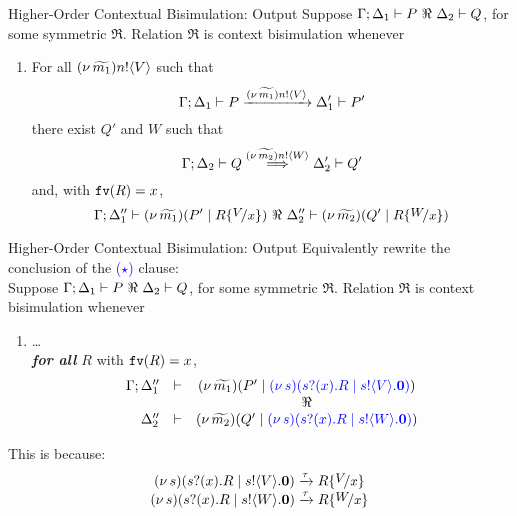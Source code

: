 \documentclass{beamer}
\newcommand{\prcolor}[1]{{\color{blue} #1}}
\begin{document}
	\begin{frame}{Higher-Order Contextual Bisimulation: Output}
		Suppose $\Gamma; \Delta_1 \proves P\ \Re\ \Delta_2 \proves Q$, for some symmetric $\Re$. Relation $\Re$ is
		context bisimulation whenever
		\begin{enumerate}[$(\star)$]
			\item	For all $(\nu\, \widetilde{m_1}) n ! \langle V \rangle$ such that
				\[
					\Gamma; \Delta_1 \vdash P \xrightarrow{(\nu\, \widetilde{m_1}) n ! \langle V \rangle} \Delta_1' \vdash P'
				\]
				there exist $Q'$ and $W$ such that 
				\[
					\Gamma; \Delta_2 \vdash Q \stackrel{(\nu\, \widetilde{m_2}) n ! \langle W \rangle}{\Longrightarrow} \Delta_2' \vdash Q'
				\]
				and,   with $\mathtt{fv}(R)=x$, 
				\[
					\Gamma; \Delta_1'' \proves \newsp{\widetilde{m_1}}{P' \Par R\subst{V}{x}}\ \Re\ \Delta_2'' \proves \newsp{\widetilde{m_2}}{Q' \Par R\subst{W}{x}}
				\]
		\end{enumerate}
	\end{frame}

	\begin{frame}{Higher-Order Contextual Bisimulation: Output}
		Equivalently rewrite the conclusion of the \textcolor{blue}{($\star$)} clause:
		\\[2mm]

		Suppose $\Gamma; \Delta_1 \proves P\ \Re\ \Delta_2 \proves Q$, for some symmetric $\Re$. Relation $\Re$ is
		context bisimulation whenever
		\begin{enumerate}[$(\star)$]
			\item	\dots\\
				\emph{\textbf{for all} $R$}  with $\mathtt{fv}(R)=x$, 
				\[
					\begin{array}{rcc}
						\Gamma; \Delta_1'' &\proves& \newsp{\widetilde{m_1}}{P' \Par \prcolor{\newsp{s}{\binp{s}{x} R \Par  \bout{s}{V} \inact}}}
						\\
						&&\Re
						\\
						\Delta_2'' &\proves&  \newsp{\widetilde{m_2}}{Q' \Par \prcolor{\newsp{s}{\binp{s}{x} R \Par \bout{s}{W} \inact}}}
					\end{array}
				\]
		\end{enumerate}
		This is because:
		\[
			\begin{array}{c}
				\newsp{s}{\binp{s}{x} R \Par \bout{s}{V} \inact}
				\by{\tau}
				R \subst{V}{x}
				\\
				\newsp{s}{\binp{s}{x} R \Par \bout{s}{W} \inact}
				\by{\tau}
				R \subst{W}{x}
			\end{array}
		\]
	\end{frame}
\end{document}
